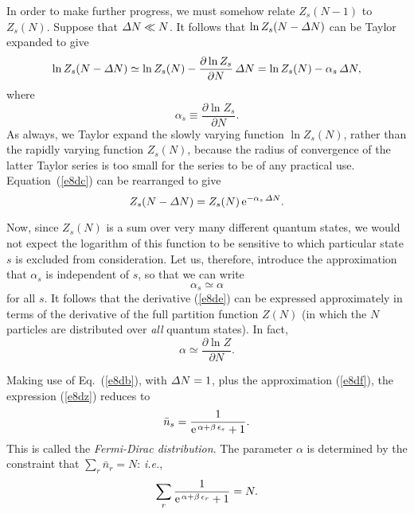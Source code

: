 In order to make further progress, we must somehow relate $Z_s(N-1)$ to
$Z_s(N)$. Suppose that ${\mit\Delta}N\ll N$. It follows that 
$\ln Z_s(N-{\mit\Delta}N)$ can be Taylor expanded  to give
\begin{equation}\label{e8dc}
\ln Z_s(N-{\mit\Delta}N) \simeq \ln Z_s(N) - \frac{\partial \ln Z_s}{\partial N}\,
{\mit\Delta} N = \ln Z_s(N) - \alpha_s\,{\mit\Delta}N,
\end{equation}
where 
\begin{equation}
\alpha_s\equiv \frac{\partial \ln Z_s}{\partial N}.\label{e8de}
\end{equation}
As always, we Taylor expand the slowly varying function $\ln Z_s(N)$, rather
than the rapidly varying function $Z_s(N)$, because the radius of
convergence of the latter Taylor series is too small for the series to
be of any practical use. Equation~(\ref{e8dc}) can be rearranged to give
\begin{equation}\label{e8db}
Z_s(N-{\mit\Delta}N) = Z_s(N)\,{\rm e}^{-\alpha_s\,{\mit\Delta}N}.
\end{equation}

Now, since $Z_s(N)$ is a sum over very many
different quantum states, we would not expect the logarithm of this
function to be  sensitive to which particular state $s$
is  excluded from consideration. Let us, therefore, introduce the
approximation that $\alpha_s$ is independent of $s$, so that we can write
\begin{equation}\label{e8df}
\alpha_s \simeq \alpha
\end{equation}
for all $s$. It follows that the derivative (\ref{e8de}) can be expressed
approximately in terms of the derivative of the full partition function
$Z(N)$ (in which the $N$ particles are distributed over
{\em all}\/ quantum states). In fact,
\begin{equation}\label{e830}
\alpha\simeq \frac{\partial \ln Z}{\partial N}.
\end{equation}

Making use of Eq.~(\ref{e8db}), with ${\mit\Delta} N =1$, plus the
approximation (\ref{e8df}), the expression (\ref{e8dz}) reduces to
\begin{equation}
\bar{n}_s = \frac{1}{{\rm e}^{\,\alpha+\beta\,\epsilon_s}+ 1}.\label{efd}
\end{equation}
This is called the {\em Fermi-Dirac distribution}. The parameter $\alpha$
is determined by the constraint that $\sum_r\bar{n}_r = N$: {\em i.e.}, 
\begin{equation}
\sum_r \frac{1}{{\rm e}^{\,\alpha+\beta\,\epsilon_r}+ 1} = N.
\end{equation}


